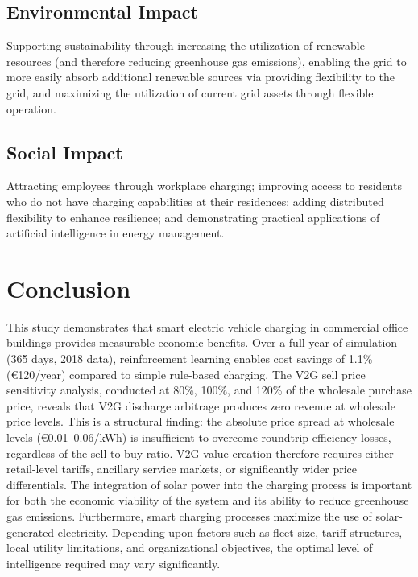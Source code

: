 \subsection{Environmental Impact}
\label{subsec:environmental}

Supporting sustainability through increasing the utilization of renewable resources (and therefore reducing greenhouse gas emissions), enabling the grid to more easily absorb additional renewable sources via providing flexibility to the grid, and maximizing the utilization of current grid assets through flexible operation.

\subsection{Social Impact}
\label{subsec:social_impact}

Attracting employees through workplace charging; improving access to residents who do not have charging capabilities at their residences; adding distributed flexibility to enhance resilience; and demonstrating practical applications of artificial intelligence in energy management.

\section{Conclusion}
\label{sec:conclusion}

This study demonstrates that smart electric vehicle charging in commercial office buildings provides measurable economic benefits. Over a full year of simulation (365 days, 2018 data), reinforcement learning enables cost savings of 1.1\% (€120/year) compared to simple rule-based charging. The V2G sell price sensitivity analysis, conducted at 80\%, 100\%, and 120\% of the wholesale purchase price, reveals that V2G discharge arbitrage produces zero revenue at wholesale price levels. This is a structural finding: the absolute price spread at wholesale levels (€0.01--0.06/kWh) is insufficient to overcome roundtrip efficiency losses, regardless of the sell-to-buy ratio. V2G value creation therefore requires either retail-level tariffs, ancillary service markets, or significantly wider price differentials. The integration of solar power into the charging process is important for both the economic viability of the system and its ability to reduce greenhouse gas emissions. Furthermore, smart charging processes maximize the use of solar-generated electricity. Depending upon factors such as fleet size, tariff structures, local utility limitations, and organizational objectives, the optimal level of intelligence required may vary significantly.

